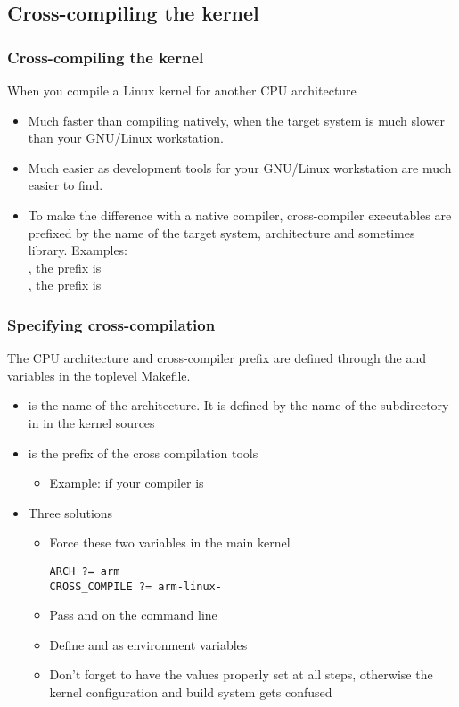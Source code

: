 \subsection{Cross-compiling the kernel}

\begin{frame}
  \frametitle{Cross-compiling the kernel}
  When you compile a Linux kernel for another CPU architecture
  \begin{itemize}
  \item Much faster than compiling natively, when the target system is
    much slower than your GNU/Linux workstation.
  \item Much easier as development tools for your GNU/Linux
    workstation are much easier to find.
  \item To make the difference with a native compiler, cross-compiler
    executables are prefixed by the name of the target system,
    architecture and sometimes
    library. Examples:\\
    \small
    , the prefix is \\
    , the prefix is 
  \end{itemize}
\end{frame}

\begin{frame}[fragile]
  \frametitle{Specifying cross-compilation}

  The CPU architecture and cross-compiler prefix are defined through
  the  and  variables in the toplevel
  Makefile.

  \begin{itemize}
  \item {} is the name of the architecture. It is defined by
    the name of the subdirectory in  in the kernel sources
  \item {} is the prefix of the cross compilation
    tools
    \begin{itemize}
    \item Example:  if your compiler is 
    \end{itemize}
  \item Three solutions
    \begin{itemize}
    \item Force these two variables in the main kernel 
\begin{verbatim}
ARCH ?= arm
CROSS_COMPILE ?= arm-linux-
\end{verbatim}
    \item Pass  and  on the 
      command line
    \item Define  and  as environment
      variables
    \item Don't forget to have the values properly set at all steps,
      otherwise the kernel configuration and build system gets
      confused
    \end{itemize}
  \end{itemize}
\end{frame}

